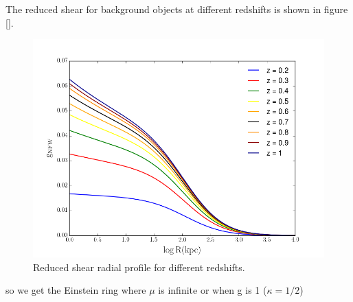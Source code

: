 The reduced shear for background objects at different redshifts is shown in figure []. 

\begin{figure}[H]
\centering
\includegraphics[width=12cm]{images/Reduced_Shear.png}
\caption[Reduced shear radial]{Reduced shear radial profile for different redshifts.}
\end{figure}

so we get the Einstein ring where $\mu$ is infinite or when g is 1 ($\kappa=1/2$)
